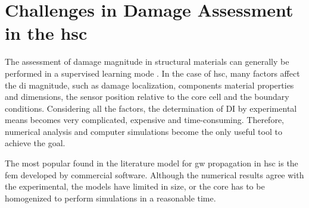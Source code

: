 \section{Challenges in Damage Assessment in the \ac{hsc}}
\label{sec:challenges}


The assessment of damage magnitude in structural materials can generally be performed in a supervised learning mode \cite{worden2007fundamental}.
In the case of \ac{hsc}, many factors affect the \ac{di} magnitude, such as damage localization, components material properties and dimensions, the sensor position relative to the core cell and the boundary conditions.
Considering all the factors, the determination of DI by experimental means becomes very complicated, expensive and time-consuming.
Therefore, numerical analysis and computer simulations become the only useful tool to achieve the goal.

The most popular found in the literature model for \ac{gw} propagation in \ac{hsc} is the \ac{fem} developed by commercial software.
Although the numerical results agree with the experimental, the models have limited in size, or the core has to be homogenized to perform simulations in a reasonable time.